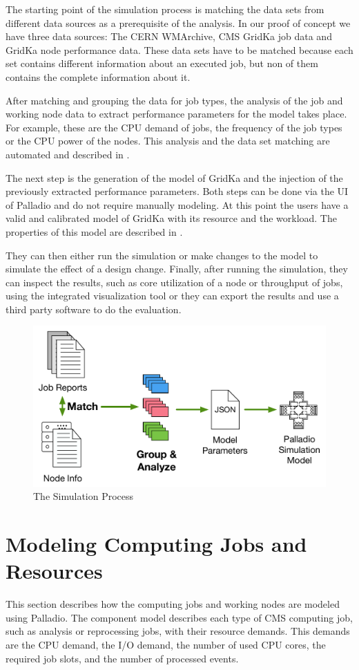 \documentclass[a4paper]{jpconf}
\begin{document}
The starting point of the simulation process is matching the data sets from different data sources as a prerequisite  of the analysis. In our proof of concept we have three data sources: The CERN WMArchive, CMS GridKa job data and GridKa node performance data. These data sets have to be matched because each set contains different information about an executed job, but non of them contains the complete information about it.

After matching and grouping the data for job types, the analysis of the job and working node data to extract performance parameters for the model takes place. For example, these are the CPU demand of jobs, the frequency of the job types or the CPU power of the nodes. This analysis and the data set matching are automated and described in .

The next step is the generation of the model of GridKa and the injection of the previously extracted performance parameters. Both steps can be done via the UI of Palladio and do not require manually modeling. At this point the users have a valid and calibrated model of GridKa with its resource and the workload. The properties of this model are described in .

They can then either run the simulation or make changes to the model to simulate the effect of a design change. 
Finally, after running the simulation, they can inspect the results, such as core utilization of a node or throughput of jobs, using the integrated visualization tool or they can export the results and use a third party software to do the evaluation.

\begin{figure}
	\centering
	\includegraphics[width=0.55\linewidth]{images/process}
	\caption[]{The Simulation Process}
	\label{process}
\end{figure}


\section{Modeling Computing Jobs and Resources}
\label{sec:model}
This section describes how the computing jobs and working nodes are modeled using Palladio.
The component model describes each type of CMS computing job, such as analysis or reprocessing jobs, with their resource demands. This demands are the CPU demand, the I/O demand, the number of used CPU cores, the required job slots, and the number of processed events.
\end{document}
